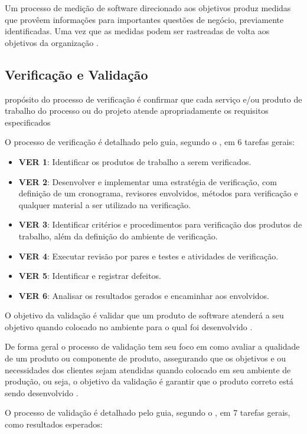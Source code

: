 Um processo de medição de software direcionado aos objetivos produz medidas que provêem informações para importantes
questões de negócio, previamente identificadas. Uma vez que as medidas podem ser rastreadas de volta aos objetivos da
organização \cite{junior}.

\subsection{Verificação e Validação}

propósito do processo de verificação é confirmar que cada serviço e/ou produto de trabalho do processo ou do projeto atende apropriadamente os requisitos especificados \cite{pressman1}

O processo de verificação é detalhado pelo guia, segundo o \cite{softex}, em 6 tarefas gerais:

\begin{itemize}
  \item \textbf{VER 1}: Identificar os produtos de trabalho a serem verificados.
  \item \textbf{VER 2}: Desenvolver e implementar uma estratégia de verificação, com definição de um cronograma,
    revisores envolvidos, métodos para verificação e qualquer material a ser utilizado na verificação.
  \item \textbf{VER 3}: Identificar critérios e procedimentos para verificação dos produtos de trabalho,
    além da definição do ambiente de verificação.
  \item \textbf{VER 4}: Executar revisão por pares e testes e atividades de verificação.
  \item \textbf{VER 5}: Identificar e registrar defeitos.
  \item \textbf{VER 6}: Analisar os resultados gerados e encaminhar aos envolvidos.
\end{itemize}

O objetivo da validação é validar que um produto de software atenderá a seu objetivo quando colocado no ambiente para o
qual foi desenvolvido \cite{sommerville}.

De forma geral o processo de validação tem seu foco em como avaliar a qualidade de um produto ou componente de produto,
assegurando que os objetivos e ou necessidades dos clientes sejam atendidas quando colocado em seu ambiente de produção,
ou seja, o objetivo da validação é garantir que o produto correto está sendo desenvolvido \cite{softex}.

O processo de validação é detalhado pelo guia, segundo o \cite{softex}, em 7 tarefas gerais, como resultados esperados:

